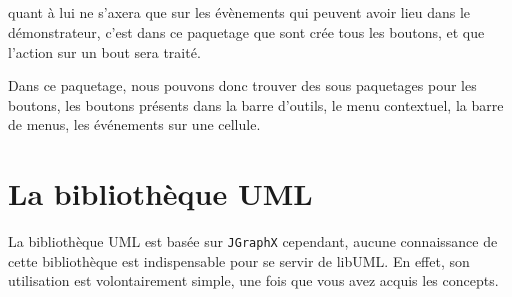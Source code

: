 \documentclass[12pt,a4paper,oneside]{book}
\begin{document}
	\paragraph{}
	 quant à lui ne s'axera que sur les évènements qui peuvent avoir lieu dans le démonstrateur, c'est dans ce paquetage que sont crée
	tous les boutons, et que l'action sur un bout sera traité.

	Dans ce paquetage, nous pouvons donc trouver des sous paquetages pour les boutons, les boutons présents dans la barre d'outils, le menu contextuel, la barre de menus, les
	événements sur une cellule.

	\chapter{La bibliothèque UML}	
	\nouveauChapitre
	La bibliothèque UML est basée sur \texttt{JGraphX} cependant, aucune connaissance de cette bibliothèque est indispensable pour se servir de libUML. En effet, son 
	utilisation est volontairement simple, une fois que vous avez acquis les concepts.
\end{document}
